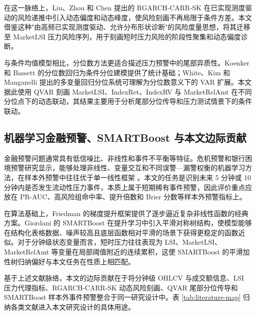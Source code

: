 \documentclass[12pt,a4paper]{ctexart}
\begin{document}
在这一脉络上，Liu、Zhou 和 Chen \cite{liu2025rgarchcarrsk} 提出的 RGARCH-CARR-SK 在已实现测度驱动的风险递推中引入动态偏度和动态峰度，使风险刻画不再局限于条件方差。本文借鉴这种"由高频已实现测度驱动、允许分布形状诊断"的风险度量思想，将其迁移至 MarketLSI 压力风险序列，用于刻画短时压力风险的阶段性聚集和动态偏度诊断。

与条件均值模型相比，分位数方法更适合描述压力预警中的尾部异质性。Koenker 和 Bassett \cite{koenker1978rq} 的分位数回归为条件分位建模提供了统计基础；White、Kim 和 Manganelli \cite{white2015varforvar} 提出的多变量回归分位系统可理解为分位数意义下的 VAR 扩展。本文据此使用 QVAR 刻画 MarketLSI、IndexRet、IndexRV 与 MarketRelAmt 在不同分位点下的动态联动，其结果主要用于分析尾部分位传导和压力测试情景下的条件联动。

\subsection{机器学习金融预警、SMARTBoost 与本文边际贡献}

金融预警问题通常具有低信噪比、非线性和事件不平衡等特征。危机预警和银行困境预警研究显示，能够处理非线性、变量交互和不同误警—漏警权衡的机器学习方法，在样本外预警中往往优于单一线性框架 \cite{holopainen2016earlywarning,suss2019bankdistress}。本文的任务是识别未来 5 分钟或 10 分钟内是否发生流动性压力事件，本质上属于短期稀有事件预警，因此评价重点应放在 PR-AUC、高风险组命中率、提升倍数和 Brier 分数等样本外预警指标上。

在算法基础上，Friedman \cite{friedman2001gbm} 的梯度提升框架提供了逐步逼近复杂非线性函数的经典方案。Giordani \cite{giordani2025smartboost} 的 SMARTBoost 在提升学习中引入平滑对称树结构，使模型能够在结构化表格数据、噪声较高且底层函数相对平滑的场景下获得更稳定的函数近似。对于分钟级状态变量而言，短时压力往往表现为 LSI、MarketLSI、MarketRelAmt 等变量在局部阈值附近的连续累积，这使 SMARTBoost 的平滑加性树归纳偏好与本文任务在性质上相匹配。

基于上述文献脉络，本文的边际贡献在于将分钟级 OHLCV 与成交额信息、LSI 压力代理指标、RGARCH-CARR-SK 动态风险刻画、QVAR 尾部分位传导和 SMARTBoost 样本外事件预警整合于同一研究设计中。表 \ref{tab:literature-map} 归纳各类文献进入本文研究设计的具体用途。
\end{document}
